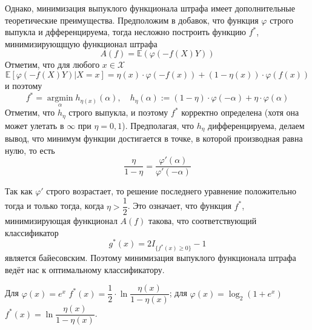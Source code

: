 \documentclass[12pt]{article}
\begin{document}
Однако, минимизация выпуклого функционала штрафа имеет дополнительные теоретические преимущества. Предположим в добавок, что функция $\varphi$ строго выпукла и дфференцируема, тогда несложно построить функцию $f^*$, минимизирующщую функционал штрафа
\begin{equation*}
	A(f)=\mathbb{E}(\varphi(-f(X)Y))
\end{equation*}
Отметим, что для любого $x\in\mathcal{X}$
\begin{equation*}
	\mathbb{E}[\varphi(-f(X)Y)| X=x]=\eta(x)\cdot\varphi(-f(x))+(1-\eta(x))\cdot\varphi(f(x))
\end{equation*}
и поэтому 
\begin{equation*}
	f^*=\operatorname{argmin}\limits_{\alpha}h_{\eta(x)}(\alpha), \quad h_\eta(\alpha):=(1-\eta)\cdot\varphi(-\alpha)+\eta\cdot\varphi(\alpha)
\end{equation*}
Отметим, что $h_{\eta}$ строго выпукла, и поэтому $f^*$ корректно определена (хотя она может улетать в $\infty$ при $\eta=0,1$). Предполагая, что $h_\eta$ дифференцируема, делаем вывод, что минимум функции достигается в точке, в которой производная равна нулю, то есть
\begin{equation*}
	\frac{\eta}{1-\eta}=\frac{\varphi'(\alpha)}{\varphi'(-\alpha)}
\end{equation*}

Так как $\varphi'$ строго возрастает, то решение последнего уравнение положительно тогда и только тогда, когда $\eta>\dfrac{1}{2}$. Это означает, что функция $f^*$, минимизирующая функционал $A(f)$ такова, что соответствующий классификатор
\begin{equation*}
	g^*(x)=2I_{\{f^*(x)\geqslant0\}}-1
\end{equation*}
является байесовским. Поэтому минимизация выпуклого функционала штрафа ведёт нас к оптимальному классификатору.

Для $\varphi(x)=e^x$ $f^*(x)=\dfrac{1}{2}\cdot\ln\dfrac{\eta(x)}{1-\eta(x)}$; для $\varphi(x)=\log_2(1+e^x)$ $f^*(x)=\ln\dfrac{\eta(x)}{1-\eta(x)}$.
\end{document}
